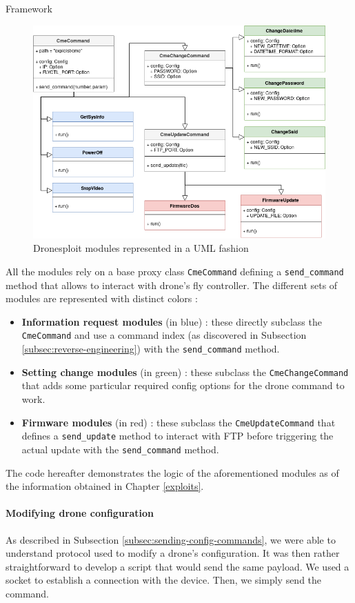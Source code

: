 \begin{chaptercover}{Framework}
\begin{figure}[H]
  \centering
  \includegraphics[width=\linewidth]{figures/dronesploit-modules}
  \caption{Dronesploit modules represented in a UML fashion}
  \label{fig:dronesploit-modules}
\end{figure}

All the modules rely on a base proxy class \texttt{CmeCommand} defining a \texttt{send\_command} method that allows to interact with drone's fly controller. The different sets of modules are represented with distinct colors :
\begin{itemize}
  \item \textbf{Information request modules} (in blue) : these directly subclass the \texttt{CmeCommand} and use a command index (as discovered in Subsection \ref{subsec:reverse-engineering}) with the \texttt{send\_command} method.
  \item \textbf{Setting change modules} (in green) : these subclass the \texttt{CmeChangeCommand} that adds some particular required config options for the drone command to work.
  \item \textbf{Firmware modules} (in red) :  these subclass the \texttt{CmeUpdateCommand} that defines a \texttt{send\_update} method to interact with FTP before triggering the actual update with the \texttt{send\_command} method.
\end{itemize}

The code hereafter demonstrates the logic of the aforementioned modules as of the information obtained in Chapter \ref{exploits}.

\paragraph{Modifying drone configuration} As described in Subsection \ref{subsec:sending-config-commands}, we were able to understand protocol used to modify a drone's configuration. It was then rather straightforward to develop a script that would send the same payload. We used a socket to establish a connection with the device. Then, we simply send the command. 


\end{chaptercover}
